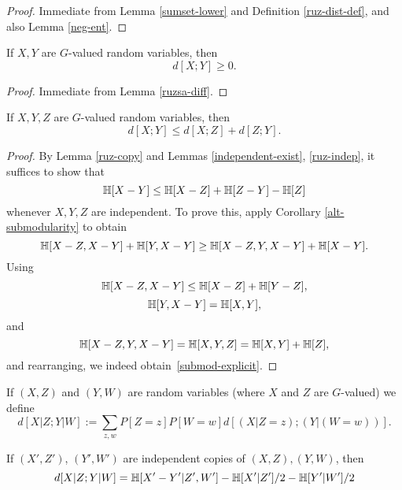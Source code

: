 \begin{proof}  Immediate from Lemma \ref{sumset-lower} and Definition \ref{ruz-dist-def}, and also Lemma \ref{neg-ent}.
\end{proof}

\begin{lemma}\label{ruzsa-nonneg}
  \leanok
  If $X,Y$ are $G$-valued random variables, then
  $$ d[X;Y] \geq 0.$$
\end{lemma}

\begin{proof}  Immediate from Lemma \ref{ruzsa-diff}.
\end{proof}

\begin{lemma}\label{ruzsa-triangle}
\leanok
  If $X,Y,Z$ are $G$-valued random variables, then
$$ d[X;Y] \leq d[X;Z] + d[Z;Y].$$
\end{lemma}

\begin{proof} By Lemma \ref{ruz-copy} and Lemmas \ref{independent-exist}, \ref{ruz-indep}, it suffices to show that
\begin{equation}\label{submod-explicit} \mathbb{H}[X - Y] \leq \mathbb{H}[X-Z] + \mathbb{H}[Z-Y] - \mathbb{H}[Z]\end{equation}
whenever $X, Y, Z$ are independent. To prove this, apply Corollary \ref{alt-submodularity} to obtain
\[ \mathbb{H}[X - Z, X - Y] + \mathbb{H}[Y, X - Y] \geq \mathbb{H}[X - Z, Y, X - Y] + \mathbb{H}[X - Y].\]
Using
\[ \mathbb{H}[X - Z, X - Y] \leq \mathbb{H}[X - Z] + \mathbb{H}[Y - Z],\]
\[ \mathbb{H}[Y, X - Y] = \mathbb{H}[X, Y], \] and
\[ \mathbb{H}[X - Z, Y, X - Y] = \mathbb{H}[X, Y, Z] = \mathbb{H}[X, Y] + \mathbb{H}[Z],\] and rearranging, we indeed obtain~\eqref{submod-explicit}.
\end{proof}

\begin{definition}\label{cond-dist-def}
If $(X, Z)$ and $(Y, W)$ are random variables (where $X$ and $Z$ are $G$-valued) we define
$$ d[X  | Z; Y | W] := \sum_{z,w} P[Z=z] P[W=w] d[(X|Z=z); (Y|(W=w))].$$
\end{definition}

\begin{lemma}\label{cond-dist-alt}
  If $(X',Z')$, $(Y',W')$ are independent copies of $(X,Z), (Y,W)$, then
$$  d[X  | Z;Y | W] = \mathbb{H}[X'-Y'|Z',W'] - \mathbb{H}[X'|Z']/2 - \mathbb{H}[Y'|W']/2$$
\end{lemma}

